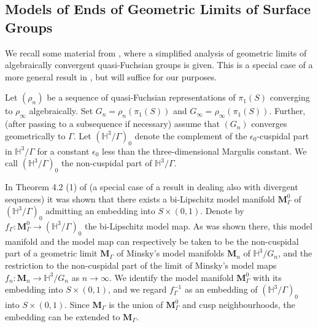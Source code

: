 \documentclass{amsart}
\theoremstyle{definition}
\newcommand\HHH{{\mathbb H}}
\begin{document}
\subsection{Models of Ends of Geometric Limits of Surface Groups}
\label{model geometric} We recall some material from \cite{OhD}, where a simplified  analysis of geometric limits of algebraically convergent quasi-Fuchsian groups is given.  This is a special case of a more general result  in \cite{OS}, but will suffice for our purposes.

Let $(\rho_n)$ be a sequence  of quasi-Fuchsian representations of $\pi_1(S)$  converging to $\rho_\infty$ algebraically.
Set $G_n=\rho_n(\pi_1(S))$ and  $G_\infty=\rho_\infty(\pi_1(S))$. Further, (after passing to a subsequence if necessary) 
assume that $(G_n)$ converges geometrically to $\Gamma$.
Let $(\HHH^3/\Gamma)_0$ denote the complement of the $\epsilon_0$-cuspidal part in $\HHH^3/\Gamma$ for a constant $\epsilon_0$ less than the three-dimensional Margulis constant.  We  call $(\HHH^3/\Gamma)_0$ the non-cuspidal part of $\HHH^3/\Gamma$.

In Theorem 4.2 (1) of \cite{OhD} (a special case of a result in \cite{OS}  dealing also with  divergent sequences) it was shown that  there exists a bi-Lipschitz model manifold $\mathbf M_\Gamma^0$ of $(\HHH^3/\Gamma)_0$ admitting an embedding
   into $S\times (0,1)$. 
   Denote by $f_\Gamma : \mathbf M_\Gamma^0 \to (\HHH^3/\Gamma)_0$  the bi-Lipschitz model map.
   As was shown there, this model manifold and the model map can respectively be taken to be the non-cuspidal part of  a geometric limit $\mathbf M_\Gamma$ of Minsky's model manifolds $\mathbf M_n$ of $\HHH^3/G_n$, and the restriction to the non-cuspidal part of the limit of Minsky's model maps $f_n \colon \mathbf M_n \to \HHH^3/G_n$ as $n \rightarrow \infty$. 
  We identify the model manifold $\mathbf M_\Gamma^0$ with its embedding into $S\times (0,1)$, and we regard $f_\Gamma^{-1}$ as an embedding of $(\HHH^3/\Gamma)_0$ into $S \times (0,1)$.
 Since $\mathbf M_\Gamma$ is the union of $\mathbf M_\Gamma^0$ and cusp neighbourhoods, the embedding can be extended to $\mathbf M_\Gamma$.
 
\end{document}
